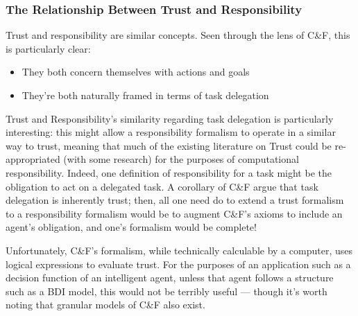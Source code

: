 
\subsubsection{The Relationship Between Trust and Responsibility}
Trust and responsibility are similar concepts. Seen through the lens of C\&F, this is particularly clear: 

\begin{itemize}
    \item They both concern themselves with actions and goals
    \item They're both naturally framed in terms of task delegation
\end{itemize}

Trust and Responsibility's similarity regarding task delegation is particularly interesting: this might allow a responsibility formalism to operate in a similar way to trust, meaning that much of the existing literature on Trust could be re-appropriated (with some research) for the purposes of computational responsibility. Indeed, one definition of responsibility for a task might be the obligation to act on a delegated task. A corollary of C\&F argue that task delegation is inherently trust; then, all one need do to extend a trust formalism to a responsibility formalism would be to augment C\&F's axioms to include an agent's obligation, and one's formalism would be complete!\par

Unfortunately, C\&F's formalism, while technically calculable by a computer, uses logical expressions to evaluate trust. For the purposes of an application such as a decision function of an intelligent agent, unless that agent follows a structure such as a BDI model, this would not be terribly useful --- though it's worth noting that granular models of C\&F also exist\cite{lorini2008binary}.
